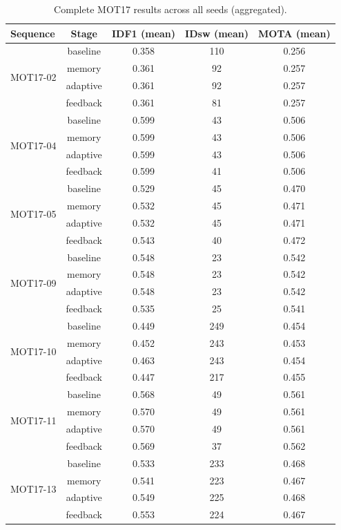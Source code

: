 \documentclass[11pt,a4paper]{article}
\begin{document}
\begin{table}[H]
\centering
\caption{Complete MOT17 results across all seeds (aggregated).}
\label{tab:mot17_all}
\begin{tabular}{@{}lcccc@{}}
\toprule
\textbf{Sequence} & \textbf{Stage} & \textbf{IDF1 (mean)} & \textbf{IDsw (mean)} & \textbf{MOTA (mean)} \\
\midrule
\multirow{4}{*}{MOT17-02} & baseline & 0.358 & 110 & 0.256 \\
 & memory & 0.361 & 92 & 0.257 \\
 & adaptive & 0.361 & 92 & 0.257 \\
 & feedback & 0.361 & 81 & 0.257 \\
\midrule
\multirow{4}{*}{MOT17-04} & baseline & 0.599 & 43 & 0.506 \\
 & memory & 0.599 & 43 & 0.506 \\
 & adaptive & 0.599 & 43 & 0.506 \\
 & feedback & 0.599 & 41 & 0.506 \\
\midrule
\multirow{4}{*}{MOT17-05} & baseline & 0.529 & 45 & 0.470 \\
 & memory & 0.532 & 45 & 0.471 \\
 & adaptive & 0.532 & 45 & 0.471 \\
 & feedback & 0.543 & 40 & 0.472 \\
\midrule
\multirow{4}{*}{MOT17-09} & baseline & 0.548 & 23 & 0.542 \\
 & memory & 0.548 & 23 & 0.542 \\
 & adaptive & 0.548 & 23 & 0.542 \\
 & feedback & 0.535 & 25 & 0.541 \\
\midrule
\multirow{4}{*}{MOT17-10} & baseline & 0.449 & 249 & 0.454 \\
 & memory & 0.452 & 243 & 0.453 \\
 & adaptive & 0.463 & 243 & 0.454 \\
 & feedback & 0.447 & 217 & 0.455 \\
\midrule
\multirow{4}{*}{MOT17-11} & baseline & 0.568 & 49 & 0.561 \\
 & memory & 0.570 & 49 & 0.561 \\
 & adaptive & 0.570 & 49 & 0.561 \\
 & feedback & 0.569 & 37 & 0.562 \\
\midrule
\multirow{4}{*}{MOT17-13} & baseline & 0.533 & 233 & 0.468 \\
 & memory & 0.541 & 223 & 0.467 \\
 & adaptive & 0.549 & 225 & 0.468 \\
 & feedback & 0.553 & 224 & 0.467 \\
\bottomrule
\end{tabular}
\end{table}
\end{document}
